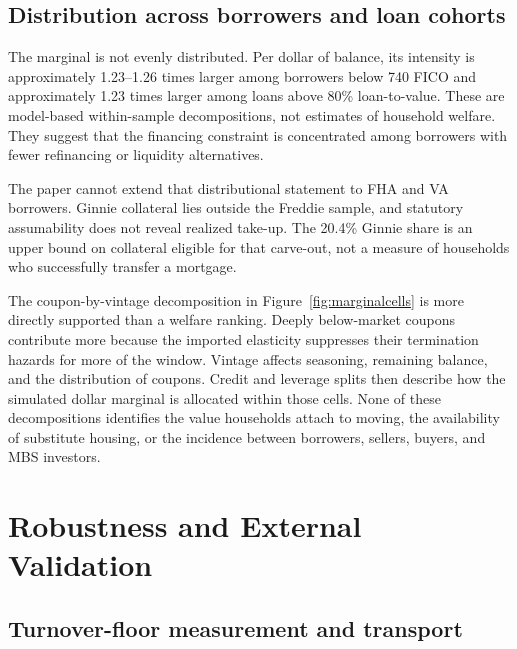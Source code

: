 \subsection{Distribution across borrowers and loan cohorts}

The marginal is not evenly distributed. Per dollar of balance, its intensity is approximately 1.23--1.26 times larger among borrowers below 740 FICO and approximately 1.23 times larger among loans above 80\% loan-to-value. These are model-based within-sample decompositions, not estimates of household welfare. They suggest that the financing constraint is concentrated among borrowers with fewer refinancing or liquidity alternatives.

The paper cannot extend that distributional statement to FHA and VA borrowers. Ginnie collateral lies outside the Freddie sample, and statutory assumability does not reveal realized take-up. The 20.4\% Ginnie share is an upper bound on collateral eligible for that carve-out, not a measure of households who successfully transfer a mortgage.

The coupon-by-vintage decomposition in Figure~\ref{fig:marginalcells} is more directly supported than a welfare ranking. Deeply below-market coupons contribute more because the imported elasticity suppresses their termination hazards for more of the window. Vintage affects seasoning, remaining balance, and the distribution of coupons. Credit and leverage splits then describe how the simulated dollar marginal is allocated within those cells. None of these decompositions identifies the value households attach to moving, the availability of substitute housing, or the incidence between borrowers, sellers, buyers, and MBS investors.

\section{Robustness and External Validation}\label{sec:validation}\label{sec:pathb-fannie}\label{sec:patha}\label{sec:abm}\label{sec:abm-results}\label{sec:abm-interp}\label{sec:robustness}\label{sec:robustness-scale}\label{sec:robustness-benchmark}\label{sec:robustness-crossdesign}\label{sec:robustness-synthesis}\label{sec:robustness-hybrid}\label{sec:robustness-floor}

\subsection{Turnover-floor measurement and transport}

